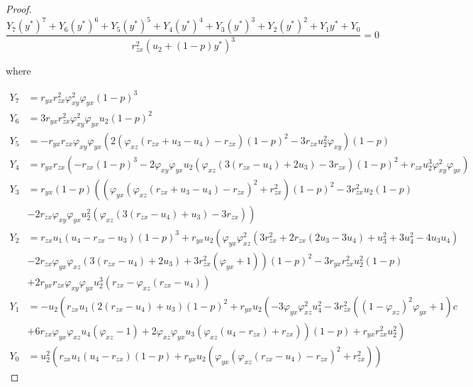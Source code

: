 \begin{proof}
    \begin{equation}\label{eq:interior-Y}
        \frac{Y_7\left(y^*\right)^7+Y_6\left(y^*\right)^6+Y_5\left(y^*\right)^5+Y_4\left(y^*\right)^4+Y_3\left(y^*\right)^3+Y_2\left(y^*\right)^2+Y_1y^*+Y_0}{r_{zx}^2\left(u_2+\left(1-p\right)y^*\right)^3}=0
    \end{equation}

    where

    \begin{align*}
        Y_7 &= r_{yx}r_{zx}^2\varphi_{xy}^2\varphi_{yx}\left(1-p\right)^3\\
        Y_6 &= 3r_{yx}r_{zx}^2\varphi_{xy}^2\varphi_{yx}u_2\left(1-p\right)^2\\
        Y_5 &= -r_{yx}r_{zx}\varphi_{xy}\varphi_{yx}\left(2\left(\varphi_{xz}\left(r_{zx}+u_3-u_4\right)-r_{zx}\right)\left(1-p\right)^2-3r_{zx}u_2^2\varphi_{xy}\right)\left(1-p\right)\\
        Y_4 &= r_{yx}r_{zx}\left(-r_{zx}\left(1-p\right)^3-2\varphi_{xy}\varphi_{yx}u_2\left(\varphi_{xz}\left(3\left(r_{zx}-u_4\right)+2u_3\right)-3r_{zx}\right)\left(1-p\right)^2+r_{zx}u_2^3\varphi_{xy}^2\varphi_{yx}\right)\\
        Y_3 &= r_{yx}\left(1-p\right)\left(\left(\varphi_{yx}\left(\varphi_{xz}\left(r_{zx}+u_3-u_4\right)-r_{zx}\right)^2+r_{zx}^2\right)\left(1-p\right)^2-3r_{zx}^2u_2\left(1-p\right)\right.\\
        &\left.-2r_{zx}\varphi_{xy}\varphi_{yx}u_2^2\left(\varphi_{xz}\left(3\left(r_{zx}-u_4\right)+u_3\right)-3r_{zx}\right)\right)\\
        Y_2 &= r_{zx}u_1\left(u_4-r_{zx}-u_3\right)\left(1-p\right)^3+r_{yx}u_2\left(\varphi_{yx}\varphi_{xz}^2\left(3r_{zx}^2+2r_{zx}\left(2u_3-3u_4\right)+u_3^2+3u_4^2-4u_3u_4\right)\right.\\
        &\left.-2r_{zx}\varphi_{yx}\varphi_{xz}\left(3\left(r_{zx}-u_4\right)+2u_3\right)+3r_{zx}^2\left(\varphi_{yx}+1\right)\right)\left(1-p\right)^2-3r_{yx}r_{zx}^2u_2^2\left(1-p\right)\\
        &+2r_{yx}r_{zx}\varphi_{xy}\varphi_{yx}u_2^3\left(r_{zx}-\varphi_{xz}\left(r_{zx}-u_4\right)\right)\\
        Y_1 &= -u_2\left(r_{zx}u_1\left(2\left(r_{zx}-u_4\right)+u_3\right)\left(1-p\right)^2+r_{yx}u_2\left(-3\varphi_{yx}\varphi_{xz}^2u_4^2-3r_{zx}^2\left(\left(1-\varphi_{xz}\right)^2\varphi_{yx}+1\right)\right.c \right.\\
        &\left.\left.+6r_{zx}\varphi_{yx}\varphi_{xz}u_4\left(\varphi_{xz}-1\right)+2\varphi_{xz}\varphi_{yx}u_3\left(\varphi_{xz}\left(u_4-r_{zx}\right)+r_{zx}\right)\right)\left(1-p\right)+r_{yx}r_{zx}^2u_2^2 \right)\\
        Y_0 &= u_2^2\left(r_{zx}u_1\left(u_4-r_{zx}\right)\left(1-p\right)+r_{yx}u_2\left(\varphi_{yx}\left(\varphi_{xz}\left(r_{zx}-u_4\right)-r_{zx}\right)^2+r_{zx}^2\right)\right)
    \end{align*}


\end{proof}
